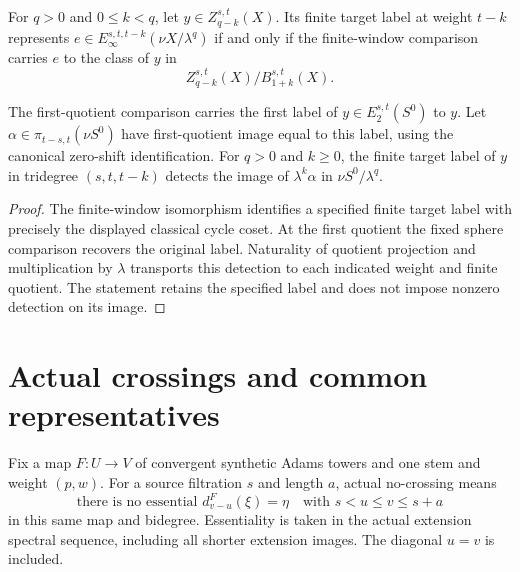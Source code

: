 \begin{theorem}
\label{sem:ProofTools:sphere-label-detection}
For $q>0$ and $0\leq k<q$, let $y\in Z_{q-k}^{s,t}(X)$. Its finite target label at weight $t-k$ represents $e\in E_\infty^{s,t,t-k}(\nu X/\lambda^q)$ if and only if the finite-window comparison carries $e$ to the class of $y$ in
\[Z_{q-k}^{s,t}(X)/B_{1+k}^{s,t}(X).\]

The first-quotient comparison carries the first label of $y\in E_2^{s,t}(S^0)$ to $y$. Let $\alpha\in\pi_{t-s,t}(\nu S^0)$ have first-quotient image equal to this label, using the canonical zero-shift identification. For $q>0$ and $k\geq0$, the finite target label of $y$ in tridegree $(s,t,t-k)$ detects the image of $\lambda^k\alpha$ in $\nu S^0/\lambda^q$.
\end{theorem}
\begin{proof}
The finite-window isomorphism identifies a specified finite target label with precisely the displayed classical cycle coset. At the first quotient the fixed sphere comparison recovers the original label. Naturality of quotient projection and multiplication by $\lambda$ transports this detection to each indicated weight and finite quotient. The statement retains the specified label and does not impose nonzero detection on its image.
\end{proof}

\section{Actual crossings and common representatives}

\begin{definition}
\label{sem:ProofTools:mh-actual-no-crossing}
Fix a map $F:U\to V$ of convergent synthetic Adams towers and one stem and weight $(p,w)$. For a source filtration $s$ and length $a$, actual no-crossing means
\[
\text{there is no essential }d_{v-u}^{F}(\xi)=\eta
\quad\text{with }s<u\leq v\leq s+a
\]
in this same map and bidegree. Essentiality is taken in the actual extension spectral sequence, including all shorter extension images. The diagonal $u=v$ is included.
\end{definition}

